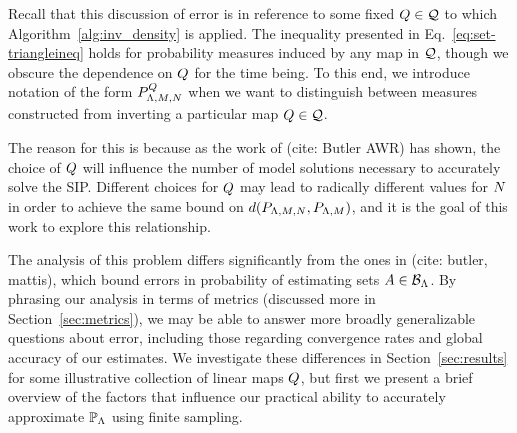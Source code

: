 Recall that this discussion of error is in reference to some fixed $Q\in\mathcal{Q}$ to which Algorithm~\ref{alg:inv_density} is applied. 
The inequality presented in Eq.~\eqref{eq:set-triangleineq} holds for probability measures induced by any map in $\mathcal{Q}$, though we obscure the dependence on $Q$ for the time being. 
To this end, we introduce notation of the form $P_{{\Lambda}, M, N}^{Q}$ when we want to distinguish between measures constructed from inverting a particular map $Q\in\mathcal{Q}$. 

The reason for this is because as the work of (cite: Butler AWR) has shown, the choice of $Q$ will influence the number of model solutions necessary to accurately solve the SIP. 
Different choices for $Q$ may lead to radically different values for $N$ in order to achieve the same bound on $d(P_{{\Lambda}, M, N}, P_{{\Lambda}, M})$, and it is the goal of this work to explore this relationship.

The analysis of this problem differs significantly from the ones in (cite: butler, mattis), which bound errors in probability of estimating sets $A\in\mathcal{B}_{{\Lambda}}$. 
By phrasing our analysis in terms of metrics (discussed more in Section~\ref{sec:metrics}), we may be able to answer more broadly generalizable questions about error, including those regarding convergence rates and global accuracy of our estimates.
We investigate these differences in Section~\ref{sec:results} for some illustrative collection of linear maps $Q$, but first we present a brief overview of the factors that influence our practical ability to accurately approximate $\operatorname*{\mathbb{P}_{{\Lambda}}}$ using finite sampling.






